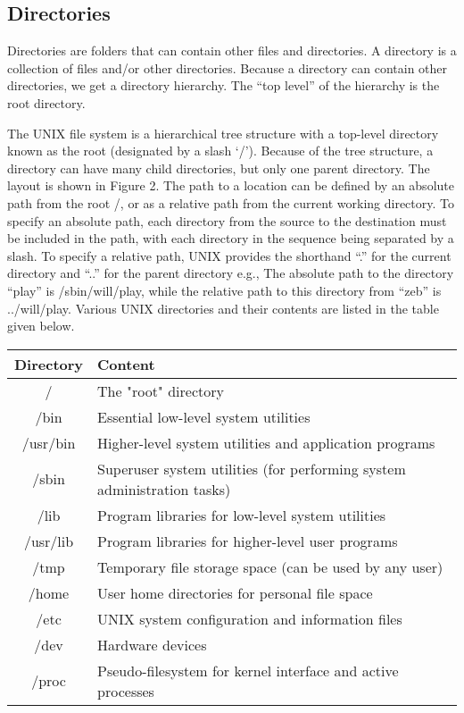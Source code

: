 \documentclass{article}
\begin{document}
\subsection{Directories}
Directories are folders that can contain other files and directories. A directory is a
collection of files and/or other directories. Because a directory can contain other
directories, we get a directory hierarchy. The “top level” of the hierarchy is the root
directory.

The UNIX file system is a hierarchical tree structure with a top-level directory known
as the root (designated by a slash ‘/’). Because of the tree structure, a directory can
have many child directories, but only one parent directory. The layout is shown in
Figure 2. The path to a location can be defined by an absolute path from the root /, or
as a relative path from the current working directory. To specify an absolute path,
each directory from the source to the destination must be included in the path, with
each directory in the sequence being separated by a slash. To specify a relative path,
UNIX provides the shorthand “.” for the current directory and “..” for the parent
directory e.g., The absolute path to the directory “play” is /sbin/will/play, while the
relative path to this directory from “zeb” is ../will/play. Various UNIX directories and
their contents are listed in the table given below.

\begin{center}
\begin{tabular}{||c p{9cm}||} 
 \hline
 \textbf{Directory} & \textbf{Content} \\ 
 \hline\hline
 / & The "root" directory \\ 
 \hline
 /bin & Essential low-level system utilities \\ 
 \hline
 /usr/bin & Higher-level system utilities and application programs \\ 
 \hline
 /sbin & Superuser system utilities (for performing system administration tasks) \\ 
 \hline
 /lib & Program libraries for low-level system utilities \\ 
 \hline
 /usr/lib & Program libraries for higher-level user programs \\ 
 \hline
 /tmp & Temporary file storage space (can be used by any user) \\ 
 \hline
 /home & User home directories for personal file space \\ 
 \hline
 /etc & UNIX system configuration and information files \\ 
 \hline
 /dev & Hardware devices \\ 
 \hline
 /proc & Pseudo-filesystem for kernel interface and active processes \\ [1ex] 
 \hline
\end{tabular}
\end{center}
\end{document}
